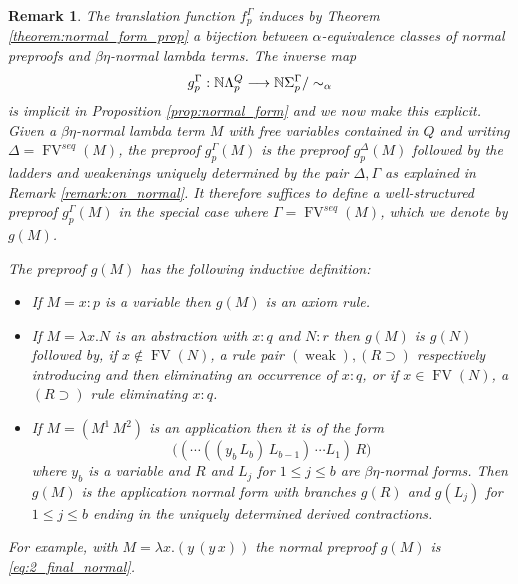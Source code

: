 \documentclass[english,letter paper,12pt,leqno]{article}
\theoremstyle{example}
\newtheorem{remark}[theorem]{Remark}
\numberwithin{equation}{section}
\def\be{\begin{equation}}
\def\ee{\end{equation}}
\def\imp{\supset}
\begin{document}
\begin{remark}\label{remark:inverse_map} The translation function $f^\Gamma_p$ induces by Theorem \ref{theorem:normal_form_prop} a bijection between $\alpha$-equivalence classes of normal preproofs and $\beta\eta$-normal lambda terms. The inverse map
\be\label{equation:inverse_translation}
g^\Gamma_p: \mathbb{N}\Lambda^Q_p \lto \mathbb{N} \Sigma^\Gamma_p / \sim_\alpha
\ee
is implicit in Proposition \ref{prop:normal_form} and we now make this explicit. Given a $\beta\eta$-normal lambda term $M$ with free variables contained in $Q$ and writing $\Delta = \operatorname{FV}^{seq}(M)$, the preproof $g^\Gamma_p(M)$ is the preproof $g^\Delta_p(M)$ followed by the ladders and weakenings uniquely determined by the pair $\Delta, \Gamma$ as explained in Remark \ref{remark:on_normal}. It therefore suffices to define a well-structured preproof $g^\Gamma_p(M)$ in the special case where $\Gamma = \operatorname{FV}^{seq}(M)$, which we denote by $g(M)$. 

The preproof $g(M)$ has the following inductive definition:
\begin{itemize}
\item If $M = x:p$ is a variable then $g(M)$ is an axiom rule.
\item If $M = \lambda x. N$ is an abstraction with $x:q$ and $N:r$ then $g(M)$ is $g(N)$ followed by, if $x \notin \operatorname{FV}(N)$, a rule pair $(\operatorname{weak}),(R \imp)$ respectively introducing and then eliminating an occurrence of $x:q$, or if $x \in \operatorname{FV}(N)$, a $(R \imp)$ rule eliminating $x:q$. 
\item If $M = (M^1 \, M^2)$ is an application then it is of the form
\be
\big( (\cdots( (y_b \, L_b) \, L_{b-1} ) \, \cdots L_1) \, R\big)
\ee
where $y_b$ is a variable and $R$ and $L_j$ for $1 \le j \le b$ are $\beta\eta$-normal forms. Then $g(M)$ is the application normal form with branches $g(R)$ and $g(L_j)$ for $1 \le j \le b$ ending in the uniquely determined derived contractions.
\end{itemize}
For example, with $M = \lambda x.(y \, (y \, x))$ the normal preproof $g(M)$ is \eqref{eq:2_final_normal}.
\end{remark}

\end{document}
